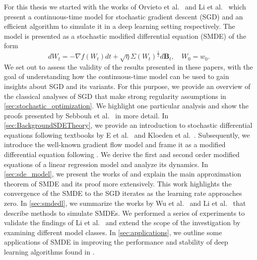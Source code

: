 \documentclass[12pt]{article}
\theoremstyle{definition}
\numberwithin{equation}{section}
\begin{document}
For this thesis we started with the works of Orvieto et al.\ \cite{orvietoContinuoustimeModelsStochastic2019a} and Li et al.\ \cite{liValidityModelingSGD2021} which present a continuous-time model for stochastic gradient descent (SGD) and an efficient algorithm to simulate it in a deep learning setting respectively. The model is presented as a stochastic modified differential equation (SMDE) of the form
\begin{equation*}
  d W_t = -\nabla f(W_t) dt + \sqrt{\eta}\Sigma(W_t)^{\frac{1}{2}}d\mathbf{B}_t, \quad W_0 = w_0.
\end{equation*}
We set out to assess the validity of the results presented in these papers, with the goal of understanding how the continuous-time model can be used to gain insights about SGD and its variants.
For this purpose, we provide an overview of the classical analyses of SGD that make strong regularity assumptions in \autoref{sec:stochastic_optimization}. We highlight one particular analysis and show the proofs presented by Sebbouh et al.\ \cite{sebbouhAlmostSureConvergence2021} in more detail.
In \autoref{sec:BackgroundSDETheory}, we provide an introduction to stochastic differential equations following textbooks by E et al.\ \cite{eAppliedStochasticAnalysis2021} and Kloeden et al.\ \cite{kloedenNumericalSolutionStochastic2013}. Subsequently, we introduce the well-known gradient flow model and frame it as a modified differential equation following \cite{smithOriginImplicitRegularization2021}. We derive the first and second order modified equations of a linear regression model and analyze its dynamics.
In \autoref{sec:sde_model}, we present the works of \cite{liStochasticModifiedEquations2019} and explain the main approximation theorem of SMDE and its proof more extensively. This work highlights the convergence of the SMDE to the SGD iterates as the learning rate approaches zero.
In \autoref{sec:smdedl}, we summarize the works by Wu et al.\ \cite{wuNoisyGradientDescent2020a} and Li et al.\ \cite{liValidityModelingSGD2021} that describe methods to simulate SMDEs. We performed a series of experiments to validate the findings of Li et al.\ \cite{liValidityModelingSGD2021} and extend the scope of the investigation by examining different model classes.  
In \autoref{sec:applications}, we outline some applications of SMDE in improving the performance and stability of deep learning algorithms found in \cite{fontaineConvergenceRatesApproximation2021, zhouTheoreticallyUnderstandingWhy2020, liValidityModelingSGD2021}.
\end{document}
